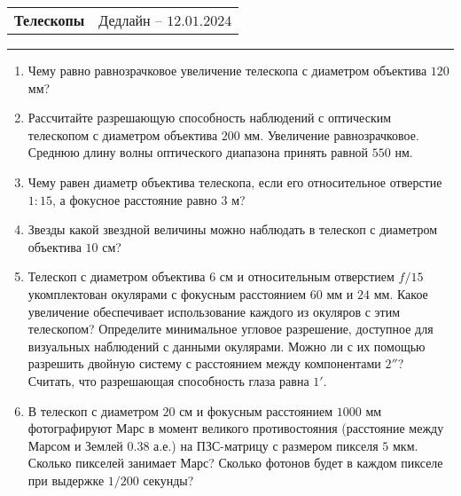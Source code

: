 \documentclass[12pt]{article}
\begin{document}
\begin{tabularx}{\textwidth}{Xr}
{\Large \textbf{Телескопы}} & Дедлайн -- $12.01.2024$ \\
\end{tabularx}
\noindent\rule{\textwidth}{0.4pt}
    \begin{enumerate}
        \item Чему равно равнозрачковое увеличение телескопа с диаметром объектива $120$ мм?
        \item Рассчитайте разрешающую способность наблюдений с оптическим телескопом с диаметром объектива $200$ мм. Увеличение равнозрачковое.
        Среднюю длину волны оптического диапазона принять равной $550$ нм.
        \item Чему равен диаметр объектива телескопа, если его относительное отверстие $1:15$, а фокусное расстояние равно $3$ м?
        \item Звезды какой звездной величины можно наблюдать в телескоп с диаметром объектива $10$ см?
        \item Телескоп с диаметром объектива $6$ см и относительным отверстием $f/15$ укомплектован окулярами с фокусным расстоянием $60$ мм и $24$ мм. Какое увеличение обеспечивает использование каждого из окуляров с этим телескопом? Определите минимальное угловое разрешение, доступное для визуальных наблюдений с данными окулярами. Можно ли с их помощью разрешить двойную систему с расстоянием между компонентами $2''$? Считать, что разрешающая способность глаза равна $1'$.
        \item В телескоп с диаметром $20$ см и фокусным расстоянием $1000$ мм фотографируют Марс в момент великого противостояния (расстояние между Марсом и Землей $0.38$ а.е.) на ПЗС-матрицу с размером пикселя $5$ мкм. Сколько пикселей занимает Марс? Сколько фотонов будет в каждом пикселе при выдержке $1/200$ секунды?
        

\end{enumerate}
\end{document}
